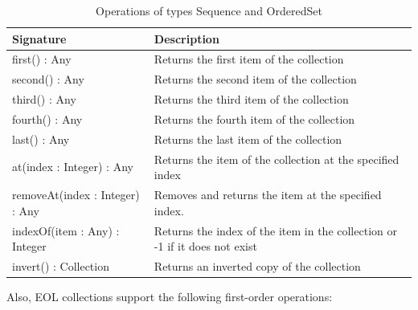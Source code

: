 \begin{longtabu} {|p{6.5cm}|X|}
			
			\caption{Operations of types Sequence and OrderedSet}
			\label{tab:SortedOperations}\\
			
			\hline
							
			\textbf{Signature} & \textbf{Description} \\\hline

			first() : Any & Returns the first item of the collection  \\\hline

			second() : Any & Returns the second item of the collection  \\\hline

			third() : Any & Returns the third item of the collection  \\\hline

			fourth() : Any & Returns the fourth item of the collection  \\\hline
				
			last() : Any & Returns the last item of the collection  \\\hline
	
			at(index : Integer) : Any & Returns the item of the collection at the specified index \\\hline
			
			removeAt(index : Integer) : Any & Removes and returns the item at the specified index. \\\hline
			
			indexOf(item : Any) : Integer & Returns the index of the item in the collection or -1 if it does not exist \\\hline

			invert() : Collection & Returns an inverted copy of the collection\\\hline
						
\end{longtabu}

Also, EOL collections support the following first-order operations:

